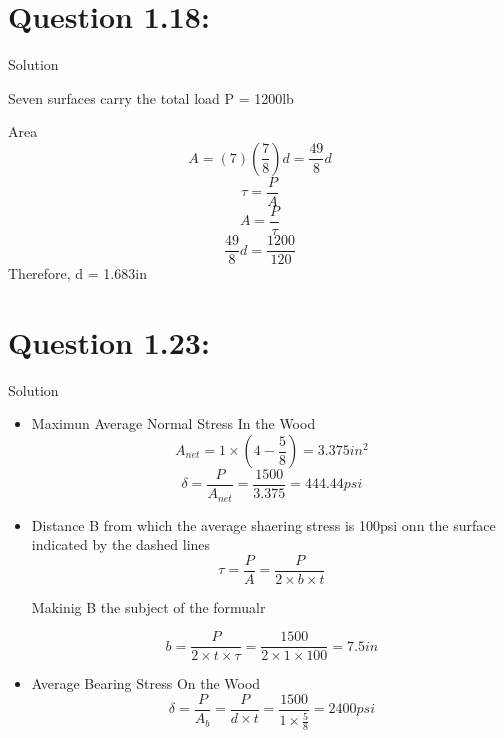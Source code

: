 \documentclass{article}
\begin{document}
\section*{\textbf{Question 1.18:}}


\begin{center} Solution \end{center}
Seven surfaces carry the total load P = 1200lb

Area \[A = (7)(\frac{7}{8})d = \frac{49}{8}d\]
\[\tau = \frac{P}{A}\]
\[A = \frac{P}{\tau}\]
\[\frac{49}{8}d = \frac{1200}{120} \]
Therefore, d = 1.683in




\section*{\textbf{Question 1.23:}}
 
\begin{center} Solution\end{center}
\begin{itemize}
\item Maximun Average Normal Stress In the Wood
\[ A_{net} = 1\times(4-\frac{5}{8}) = 3.375in^{2}\]
\[\delta = \frac{P}{A_{net}} = \frac{1500}{3.375} = 444.44psi\]
\item  Distance B from which the average shaering stress is 100psi onn the surface indicated by the dashed lines
\[\tau = \frac{P}{A} = \frac{P}{2\times b\times t}\]
\begin{center}Makinig B the subject of the formualr \end{center}
\[b = \frac{P}{2\times t\times\tau} = \frac{1500}{2\times 1\times100} = 7.5in\]
\item Average Bearing Stress On the Wood
\[\delta = \frac{P}{A_{b}} = \frac{P}{d\times t}=\frac{1500}{1\times\frac{5}{8}} =2400psi\]
\end{itemize}
\end{document}

